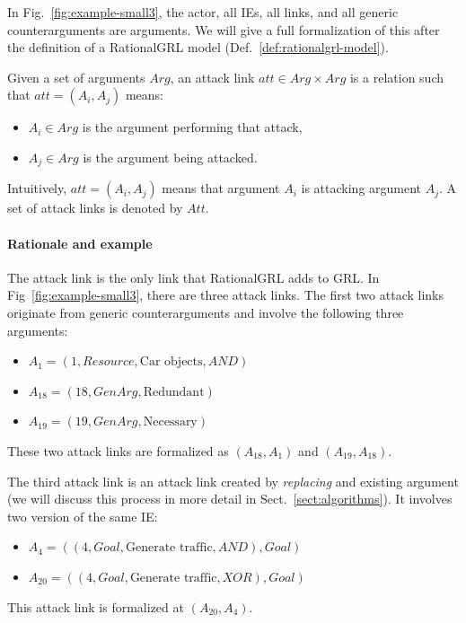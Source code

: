 In Fig.~\ref{fig:example-small3}, the actor, all IEs, all links, and all generic counterarguments are arguments. We will give a full formalization of this after the definition of a RationalGRL model (Def.~\ref{def:rationalgrl-model}).

\begin{definition}
\label{def:link:attack}
Given a set of arguments $Arg$, an attack link $att\in Arg\times Arg$ is a relation such that $att=(A_i,A_j)$ means:
\begin{itemize}
\item $A_i\in Arg$ is the argument performing that attack,
\item $A_j\in Arg$ is the argument being attacked.
\end{itemize}
Intuitively, $att=(A_i,A_j)$ means that argument $A_i$ is attacking argument $A_j$. A set of attack links is denoted by $Att$.
\end{definition}

\paragraph{Rationale and example} The attack link is the only link that RationalGRL adds to GRL. In Fig~\ref{fig:example-small3}, there are three attack links. The first two attack links originate from generic counterarguments and involve the following three arguments:
\begin{itemize}
\item $A_1 = (1, Resource, \text{Car objects}, AND)$
\item $A_{18} = (18, GenArg, \text{Redundant})$
\item $A_{19} = (19, GenArg, \text{Necessary})$
\end{itemize}

These two attack links are formalized as $(A_{18},A_{1})$ and $(A_{19}, A_{18})$.

The third attack link is an attack link created by \emph{replacing} and existing argument (we will discuss this process in more detail in Sect.~\ref{sect:algorithms}). It involves two version of the same IE:
\begin{itemize}
\item $A_{4} = ((4, Goal, \text{Generate traffic}, AND), Goal)$
\item $A_{20} = ((4, Goal, \text{Generate traffic}, XOR), Goal)$
\end{itemize}

This attack link is formalized at $(A_{20},A_4)$.

